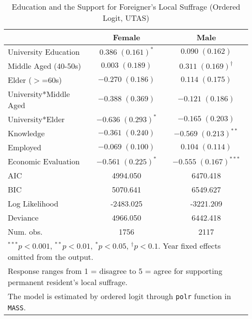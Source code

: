 
\begin{table}
\caption{Education and the Support for Foreigner's Local Suffrage (Ordered Logit, UTAS)}
\begin{center}
\begin{tabular}{l c c }
\toprule
 & Female & Male \\
\midrule
University Education   & $0.386 \; (0.161)^{*}$  & $0.090 \; (0.162)$           \\
Middle Aged (40-50s)   & $0.003 \; (0.189)$      & $0.311 \; (0.169)^{\dagger}$ \\
Elder ($>$=60s)        & $-0.270 \; (0.186)$     & $0.114 \; (0.175)$           \\
University*Middle Aged & $-0.388 \; (0.369)$     & $-0.121 \; (0.186)$          \\
University*Elder       & $-0.636 \; (0.293)^{*}$ & $-0.165 \; (0.203)$          \\
Knowledge              & $-0.361 \; (0.240)$     & $-0.569 \; (0.213)^{**}$     \\
Employed               & $-0.069 \; (0.100)$     & $0.104 \; (0.114)$           \\
Economic Evaluation    & $-0.561 \; (0.225)^{*}$ & $-0.555 \; (0.167)^{***}$    \\
\midrule
AIC                    & 4994.050                & 6470.418                     \\
BIC                    & 5070.641                & 6549.627                     \\
Log Likelihood         & -2483.025               & -3221.209                    \\
Deviance               & 4966.050                & 6442.418                     \\
Num. obs.              & 1756                    & 2117                         \\
\bottomrule
\multicolumn{3}{l}{\scriptsize{$^{***}p<0.001$, $^{**}p<0.01$, $^*p<0.05$, $^{\dagger}p<0.1$. Year fixed effects omitted from the output.}} \\ \multicolumn{3}{l}{\scriptsize{Response ranges from 1 = disagree to 5 = agree for supporting permanent resident's local suffrage.}} \\ \multicolumn{3}{l}{\scriptsize{The model is estimated by ordered logit through \texttt{polr} function in \texttt{MASS}.}}
\end{tabular}
\label{oltab_umo}
\end{center}
\end{table}

